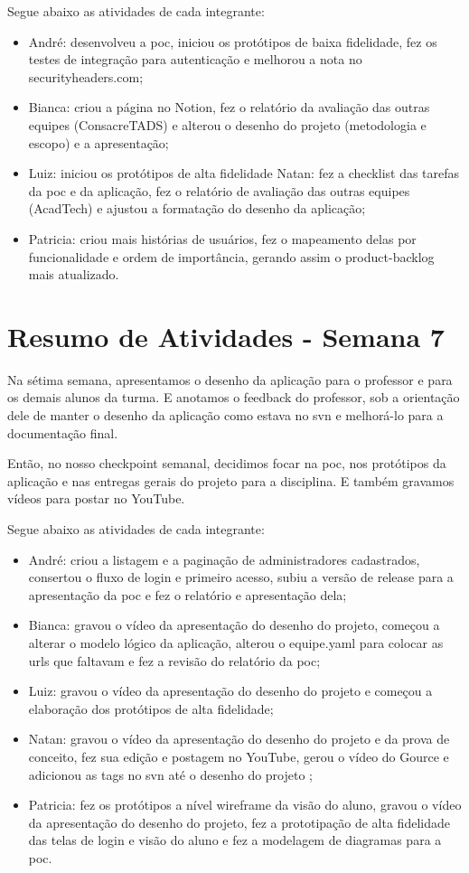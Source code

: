 \begin{apendicesenv}
Segue abaixo as atividades de cada integrante:

\begin{itemize}
\item André: desenvolveu a \ac{poc}, iniciou os protótipos de baixa fidelidade, fez os testes de integração para autenticação e melhorou a nota no securityheaders.com;
\item Bianca: criou a página no Notion, fez o relatório da avaliação das outras equipes (ConsacreTADS) e alterou o desenho do projeto (metodologia e escopo) e a apresentação;
\item Luiz: iniciou os protótipos de alta fidelidade
Natan: fez a \gls{checklist} das tarefas da \ac{poc} e da aplicação, fez o relatório de avaliação das outras equipes (AcadTech) e ajustou a formatação do desenho da aplicação;
\item Patricia: criou mais histórias de usuários, fez o mapeamento delas por funcionalidade e ordem de importância, gerando assim o \gls{product-backlog} mais atualizado.
\end{itemize}

\section{Resumo de Atividades - Semana 7}
Na sétima semana, apresentamos o desenho da aplicação para o professor e para os demais alunos da turma. E anotamos o feedback do professor, sob a orientação dele de manter o desenho da aplicação como estava no \ac{svn} e melhorá-lo para a documentação final.

Então, no nosso checkpoint semanal, decidimos focar na \ac{poc}, nos protótipos da aplicação e nas entregas gerais do projeto para a disciplina. E também gravamos vídeos para postar no YouTube.

Segue abaixo as atividades de cada integrante:

\begin{itemize}
\item André: criou a listagem e a paginação de administradores cadastrados, consertou o fluxo de login e primeiro acesso, subiu a versão de \gls{release} para a apresentação da \ac{poc} e fez o relatório e apresentação dela;
\item Bianca: gravou o vídeo da apresentação do desenho do projeto, começou a alterar o modelo lógico da aplicação, alterou o equipe.yaml para colocar as \ac{url}s que faltavam e fez a revisão do relatório da \ac{poc};
\item Luiz: gravou o vídeo da apresentação do desenho do projeto e começou a elaboração dos protótipos de alta fidelidade;
\item Natan: gravou o vídeo da apresentação do desenho do projeto e da prova de conceito, fez sua edição e postagem no YouTube, gerou o vídeo do Gource e adicionou as tags no \ac{svn} até o desenho do projeto ;
\item Patricia: fez os protótipos a nível \gls{wireframe} da visão do aluno, gravou o vídeo da apresentação do desenho do projeto, fez a prototipação de alta fidelidade das telas de login e visão do aluno e fez a modelagem de diagramas para a \ac{poc}.
\end{itemize}


\end{apendicesenv}
